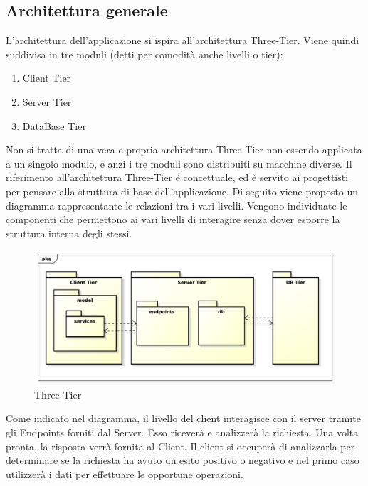 	\subsection{Architettura generale}
	\label{susb:architettura_generale}
	L’architettura dell'applicazione si ispira all'architettura Three-Tier. Viene quindi suddivisa in tre moduli (detti per comodità anche livelli o tier):
		\begin{enumerate}
			\item Client Tier
			\item Server Tier
			\item DataBase Tier
		\end{enumerate}
		\noindent
		Non si tratta di una vera e propria architettura Three-Tier non essendo applicata a un singolo modulo, e anzi i tre moduli sono distribuiti su macchine diverse. Il riferimento all'architettura Three-Tier è concettuale, ed è servito ai progettisti per pensare alla struttura di base dell'applicazione. Di seguito viene proposto un diagramma rappresentante le relazioni tra i vari livelli. Vengono individuate le componenti che permettono ai vari livelli di interagire senza dover esporre la struttura interna degli stessi. \newline \newline

		\begin{figure}[htbp]
			\centering
			\centerline{\includegraphics[scale=0.5]{./images/three_tier.pdf}}
			\caption{Three-Tier}
		\end{figure}

		Come indicato nel diagramma, il livello del client interagisce con il server tramite gli Endpoints forniti dal Server. Esso riceverà e analizzerà la richiesta. Una volta pronta, la risposta verrà fornita al Client. \newline
		Il client si occuperà di analizzarla per determinare se la richiesta ha avuto un esito positivo o negativo e nel primo caso utilizzerà i dati per effettuare le opportune operazioni.

